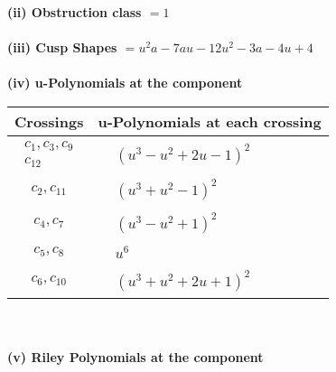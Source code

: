 \documentclass[1p]{elsarticle_modified}
\theoremstyle{definition}
\begin{document}
\flushleft \textbf{(ii) Obstruction class $= 1$}\\~\\
\flushleft \textbf{(iii) Cusp Shapes $= u^2 a-7 a u-12 u^2-3 a-4 u+4$}\\~\\
\newpage\renewcommand{\arraystretch}{1}
\flushleft \textbf{(iv) u-Polynomials at the component}\newline \\
\begin{tabular}{m{50pt}|m{274pt}}
Crossings & \hspace{64pt}u-Polynomials at each crossing \\
\hline $$\begin{aligned}c_{1},c_{3},c_{9}\\c_{12}\end{aligned}$$&$\begin{aligned}
&(u^3- u^2+2 u-1)^2
\end{aligned}$\\
\hline $$\begin{aligned}c_{2},c_{11}\end{aligned}$$&$\begin{aligned}
&(u^3+u^2-1)^2
\end{aligned}$\\
\hline $$\begin{aligned}c_{4},c_{7}\end{aligned}$$&$\begin{aligned}
&(u^3- u^2+1)^2
\end{aligned}$\\
\hline $$\begin{aligned}c_{5},c_{8}\end{aligned}$$&$\begin{aligned}
&u^6
\end{aligned}$\\
\hline $$\begin{aligned}c_{6},c_{10}\end{aligned}$$&$\begin{aligned}
&(u^3+u^2+2 u+1)^2
\end{aligned}$\\
\hline
\end{tabular}\\~\\
\newpage\renewcommand{\arraystretch}{1}
\flushleft \textbf{(v) Riley Polynomials at the component}\newline \\
\end{document}
